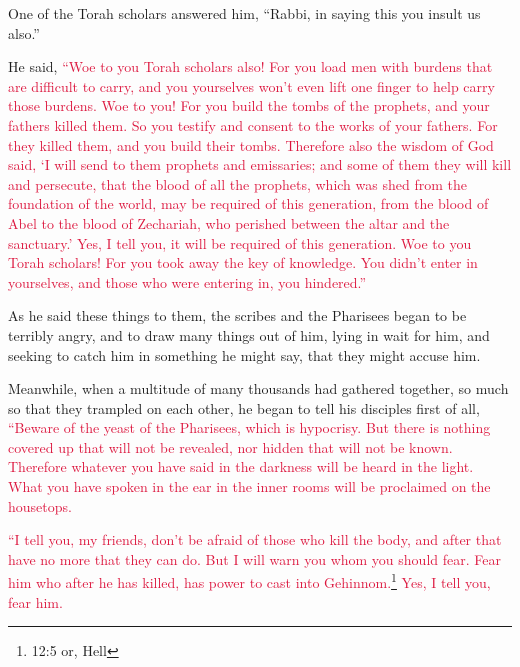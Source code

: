 \myverse{}One of the Torah scholars answered him, “Rabbi, in saying this
you insult us also.”

\myverse{}He said,
\textcolor{crimson}{“Woe to you Torah scholars also! For you load men with burdens that are difficult to carry, and you
	yourselves won’t even lift one finger to help carry those burdens.
}
\myverse{}\textcolor{crimson}{Woe to you! For you build the tombs of the prophets, and your fathers
	killed them.
}
\myverse{}\textcolor{crimson}{So you testify and consent to the works of your fathers. For they killed
	them, and you build their tombs.
}
\myverse{}\textcolor{crimson}{Therefore also the wisdom of God said, ‘I will send to them prophets
	and emissaries; and some of them they will kill and persecute,
}
\myverse{}\textcolor{crimson}{that the blood of all the prophets, which was shed from the foundation
	of the world, may be required of this generation,
}
\myverse{}\textcolor{crimson}{from the blood of Abel to the blood of Zechariah, who perished between
	the altar and the sanctuary.’ Yes, I tell you, it will be required of this generation.
}
\myverse{}\textcolor{crimson}{Woe to you Torah scholars! For you took away the key of knowledge. You
	didn’t enter in yourselves, and those who were entering in, you hindered.”
}

\myverse{}As he said these things to them, the scribes and the Pharisees
began to be terribly angry, and to draw many things out of him,
\myverse{}lying in wait for him, and seeking to catch him in something he might say,
that they might accuse him.


\mychapter{} \myverse*{}Meanwhile, when a multitude of many thousands had gathered together, so much so that they trampled on each other, he began to tell his disciples first of all, \textcolor{crimson}{“Beware of the yeast of the Pharisees, which is hypocrisy.} \myverse{}\textcolor{crimson}{But there is nothing covered up that will not be revealed, nor hidden that will not be known.} \myverse{}\textcolor{crimson}{Therefore whatever you have said in the darkness will be heard in the light. What you have spoken in the ear in the inner rooms will be proclaimed on the housetops.}

\myverse{}\textcolor{crimson}{“I tell you, my friends, don’t be afraid of those who kill the body, and after that have no more that they can do.} \myverse{}\textcolor{crimson}{But I will warn you whom you should fear. Fear him who after he has killed, has power to cast into Gehinnom.}\footnote{12:5 or, Hell} \textcolor{crimson}{Yes, I tell you, fear him.}

